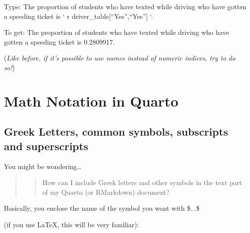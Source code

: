 \documentclass[
  letterpaper,
  DIV=11,
  numbers=noendperiod]{scrreprt}
\theoremstyle{remark}
\begin{document}
Type: The proportion of students who have texted while driving who have
gotten a speeding ticket is ` r driver\_table{[}``Yes'',``Yes''{]} `.

To get: The proportion of students who have texted while driving who
have gotten a speeding ticket is 0.2809917.

(\emph{Like before, if it's possible to use names instead of numeric
indices, try to do so!})

\chapter{Math Notation in Quarto}\label{math-notation-in-quarto}

\section{Greek Letters, common symbols, subscripts and
superscripts}\label{greek-letters-common-symbols-subscripts-and-superscripts}

You might be wondering\ldots{}

\begin{quote}
\begin{quote}
How can I include Greek letters and other symbols in the text part of my
Quarto (or RMarkdown) document?
\end{quote}
\end{quote}

Basically, you enclose the name of the symbol you want with \$...\$

(if you use LaTeX, this will be very familiar):
\end{document}
